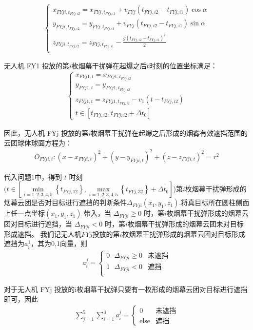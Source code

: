 \documentclass[../main.tex]{subfiles}
\begin{document}
\begin{itemize}
\begin{align}
\left\{ \begin{array}{l}
	x_{FYji,t_{FYj,i2}}=x_{FYj,t_{FYj,i1}}+v_{FYj}\left( t_{FYj,i2}-t_{FYj,i1} \right) \cos \alpha\\
	y_{FYji,t_{FYj,i2}}=y_{FYj,t_{FYj,i1}}+v_{FYj}\left( t_{FYj,i2}-t_{FYj,i1} \right) \sin \alpha\\
	z_{FYji,t_{FYj,i2}}=z_{FYj,t_{FYj,i1}}-\frac{g\left( t_{FYj,i2}-t_{FYj,i1} \right) ^2}{2}\\
\end{array} \right. 
\end{align}
\par 无人机 FY1 投放的第$i$枚烟幕干扰弹在起爆之后$t$时刻的位置坐标满足：
\begin{align}\label{19.9}
	\left\{ \begin{array}{l}
	x_{FYj1,t}=x_{FYj1,t_{FYj,i2}}\\
	y_{FYj1,t}=y_{FYj1,t_{FYj,i2}}\\
	z_{FYj1,t}=z_{FYj1,t_{FYj,i2}}-v_1\left( t-t_{FYj,i2} \right)\\
	t\in \left[ t_{FYj,i2},t_{FYj,i2}+\Delta t_0 \right]
\end{array} \right.
\end{align}
\par 因此，无人机 FYj 投放的第$i$枚烟幕干扰弹在起爆之后形成的烟雾有效遮挡范围的云团球体球面方程为：
\begin{align}
	O_{FYji,t}:\left( x-x_{FYji,t} \right) ^2+\left( y-y_{FYji,t} \right) ^2+\left( z-z_{FYji,t} \right) ^2=r^2 
\end{align}
\par 代入问题1中，得到 $t$ 时刻$(t\in \left[ \underset{i=1,2,3,4,5}{\min}\left\{ t_{FYj,12} \right\} ,\underset{i=1,2,3,4,5}{\max}\left\{ t_{FYj,32} \right\} +\Delta t_0 \right]$)第$i$枚烟幕干扰弹形成的烟幕云团是否对目标进行遮挡的判断条件$\Delta _{FYji}\left( x_1,y_1,z_1 \right) $.将真目标所在圆柱侧面上任一点坐标$(x_1, y_1, z_1)$ 带入，当 $\Delta _{FYji} \geq 0$ 时，第$i$枚烟幕干扰弹形成的烟幕云团对目标进行遮挡，当 $\Delta _{FYji} < 0$ 时，第$i$枚烟幕干扰弹形成的烟幕云团未对目标形成遮挡。 我们记无人机$FYj$投放的第$i$枚烟幕干扰弹形成的烟幕云团对目标形成遮挡为$a_{i}^{1}$，其为0,1向量，则
\begin{align}
a_{i}^{j}=\begin{cases}
	0\ \ \ \Delta _{FYji}\geq 0&		\text{未遮挡}\\
	1\ \ \ \Delta _{FYji}<0&		\text{遮挡}\\
\end{cases}
\end{align}\label{19.7}
\par 对于无人机 FYj 投放的i枚烟幕干扰弹只要有一枚形成的烟幕云团对目标进行遮挡即可，因此
\begin{align}
\sum_{j=1}^5\sum_{i=1}^{3} a_{i}^{j} = 
\begin{cases} 
0 & \text{未遮挡} \\
\text{else} & \text{遮挡}
\end{cases}
\end{align}




\end{itemize}
\end{document}
